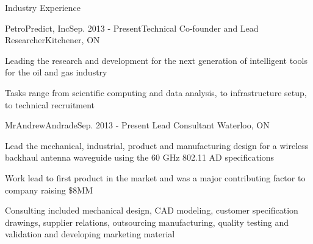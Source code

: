 \documentclass{resume} %
\begin{document}
\begin{rSection}{Industry Experience}

\begin{rSubsection}{PetroPredict, Inc}{Sep. 2013 - Present}{Technical Co-founder and Lead Researcher}{Kitchener, ON}
\item Leading the research and development for the next generation of intelligent tools for the oil and gas industry
\item Tasks range from scientific computing and data analysis, to infrastructure setup, to technical recruitment 
\end{rSubsection}

\begin{rSubsection}{ MrAndrewAndrade}{Sep. 2013 - Present }{Lead Consultant }{Waterloo, ON}
\item Lead the mechanical, industrial, product and manufacturing design for a wireless backhaul antenna waveguide using the 60 GHz 802.11 AD specifications
\item Work lead to first product in the market and was a major contributing factor to company raising \$8MM
\item Consulting included mechanical design, CAD modeling, customer specification drawings, supplier relations, outsourcing manufacturing, quality testing and validation and developing marketing material
\end{rSubsection}



\end{rSection}
\end{document}

